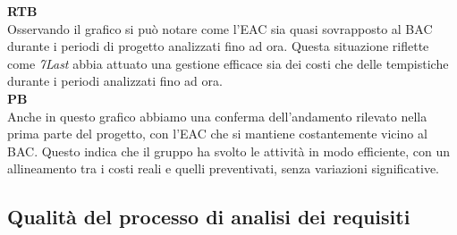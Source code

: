 \begin{flushleft}
\textbf{RTB} \\
Osservando il grafico si può notare come l'EAC sia quasi sovrapposto al BAC durante i periodi di progetto analizzati fino ad ora. Questa situazione riflette come \textit{7Last} abbia attuato una gestione efficace sia dei costi che delle tempistiche durante i periodi analizzati fino ad ora. \\

\textbf{PB} \\
Anche in questo grafico abbiamo una conferma dell'andamento rilevato nella prima parte del progetto, con l'EAC che si mantiene costantemente vicino al BAC. Questo indica che il gruppo ha svolto le attività in modo efficiente, con un allineamento tra i costi reali e quelli preventivati, senza variazioni significative.
\end{flushleft}
\newpage
\subsection{Qualità del processo di analisi dei requisiti}
